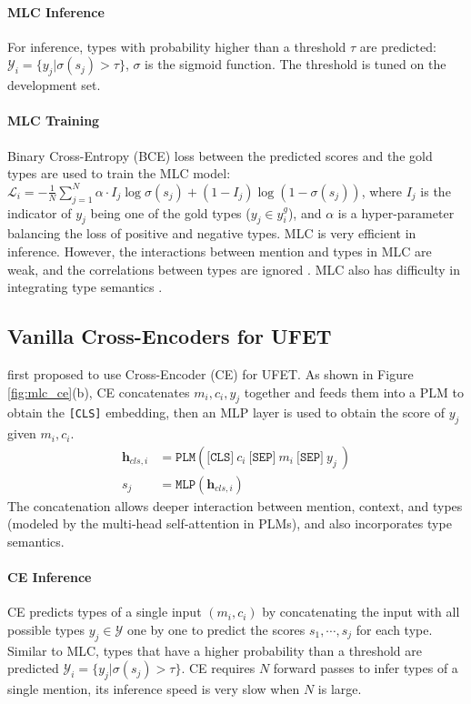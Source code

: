 \paragraph{MLC Inference} For inference, types with probability higher than a threshold $\tau$ are predicted: $\mathcal{Y}_i = \{y_j | \sigma(s_j) > \tau \}$, $\sigma$ is the sigmoid function. The threshold is tuned on the development set.
\paragraph{MLC Training} Binary Cross-Entropy (BCE) loss between the predicted scores and the gold types are used to train the MLC model: $\mathcal{L}_i = -\frac{1}{N} \sum_{j=1}^N  \alpha \cdot I_{j} \log \sigma(s_j) + (1-I_{j}) \log (1-\sigma(s_j)) $, where $I_j$ is the indicator of $y_j$ being one of the gold types ($y_j \in y_i^g$), and $\alpha$ is a hyper-parameter balancing the loss of positive and negative types. MLC is very efficient in inference. However, the interactions between mention and types in MLC are weak, and the correlations between types are ignored \cite{box4types,xiong-etal-2019-imposing,npcrf}. MLC also has difficulty in integrating type semantics \cite{lite}.

\subsection{Vanilla Cross-Encoders for UFET}
\label{sec:vanilla_ce}
\citet{lite} first proposed to use Cross-Encoder (CE) for UFET. As shown in Figure \ref{fig:mlc_ce}(b), CE concatenates $m_i, c_i, y_j$ together and feeds them into a PLM to obtain the {\tt [CLS]} embedding, then an MLP layer is used to obtain the score of $y_j$ given $m_i, c_i$.
\begin{align}
        \bm{h}_{cls, i} &= \texttt{PLM}(\texttt{[CLS]} \ c_i \ \texttt{[SEP]}\  m_i \ \texttt{[SEP]} \ y_j\ ) \\
        s_j &= \texttt{MLP}(\bm{h}_{cls, i})
\end{align}
The concatenation allows deeper interaction between mention, context, and types (modeled by the multi-head self-attention in PLMs), and also incorporates type semantics.
\paragraph{CE Inference} CE predicts types of a single input $(m_i, c_i)$ by concatenating the input with all possible types $y_j \in \mathcal{Y}$ one by one to predict the scores $s_1, \cdots, s_j$ for each type. Similar to MLC, types that have a higher probability than a threshold are predicted $\mathcal{Y}_i = \{y_j | \sigma(s_j) > \tau \}$. CE requires $N$ forward passes to infer types of a single mention, its inference speed is very slow when $N$ is large.
